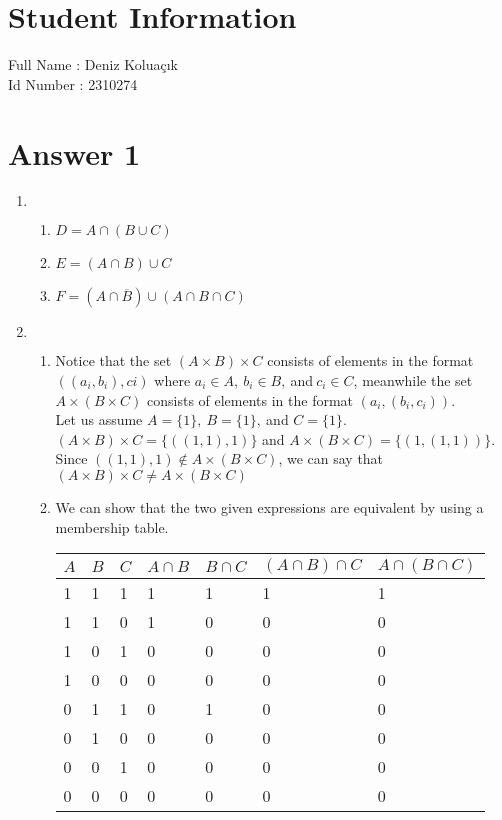 \documentclass[11pt]{article}
\begin{document}
\section*{Student Information } 
Full Name : Deniz Koluaçık \\
Id Number : 2310274 \\

\section*{Answer 1}
\begin{enumerate}[label=\textbf{\alph*)}]
	\item $ $
		\begin{enumerate}[label=(\roman*)]
			\item $D = A \cap (B \cup C)$
			\item $E = (A \cap B) \cup C$
			\item $F = (A \cap \overline{B})\cup(A\cap B\cap C)$

		\end{enumerate}
	\item $ $
	\begin{enumerate}[label=(\roman*)]
		\item Notice that the set $(A \times B) \times C$ consists of elements in the format $((a_i,b_i),ci)$ where $a_i \in A,\ b_i \in B,\ $and$\ c_i \in C$, meanwhile the set $A\times (B\times C)$ consists of elements in the format $(a_i, (b_i, c_i))$.\\

			Let us assume $A = \{1\},\ B=\{1\},\ $and $C=\{1\}$.\\
			$(A\times B)\times C = \{ ((1,1),1)\}$ and $A\times(B\times C)=\{(1,(1,1))\}$.\\
			Since $((1,1),1) \notin A\times(B \times C)$, we can say that $(A\times B)\times C \neq A\times(B\times C)$\\
	\item We can show that the two given expressions are equivalent by using a membership table.\\


		\begin{tabular}{*7{l}}
			\toprule
			$A$ & $B$ & $C$  & $A\cap B$ & $B\cap C$ & $(A\cap B)\cap C$ & $A\cap(B\cap C)$\\
			\midrule
			1 & 1 & 1 & 1 & 1 & 1 & 1\\
			1 & 1 & 0 & 1 & 0 & 0 & 0\\
			1 & 0 & 1 & 0 & 0 & 0 & 0\\
			1 & 0 & 0 & 0 & 0 & 0 & 0\\
			0 & 1 & 1 & 0 & 1 & 0 & 0\\
			0 & 1 & 0 & 0 & 0 & 0 & 0\\
			0 & 0 & 1 & 0 & 0 & 0 & 0\\
			0 & 0 & 0 & 0 & 0 & 0 & 0\\
			\bottomrule


\end{tabular}
\end{enumerate}
\end{enumerate}
\end{document}
